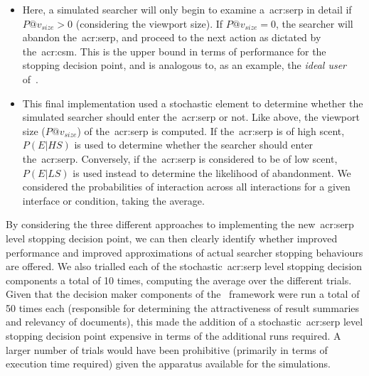 \begin{itemize}
    \item{ Here, a simulated searcher will only begin to examine a~\gls{acr:serp} in detail if $P@v_{size} > 0$ (considering the viewport size). If $P@v_{size} = 0$, the searcher will abandon the~\gls{acr:serp}, and proceed to the next action as dictated by the~\gls{acr:csm}. This is the upper bound in terms of performance for the stopping decision point, and is analogous to, as an example, the \emph{ideal user} of~\cite{hagen2016simulating_users}.}
    
    \item{ This final implementation used a stochastic element to determine whether the simulated searcher should enter the~\gls{acr:serp} or not. Like above, the viewport size ($P@v_{size}$) of the~\gls{acr:serp} is computed. If the~\gls{acr:serp} is of high scent, $P(E|HS)$ is used to determine whether the searcher should enter the~\gls{acr:serp}. Conversely, if the~\gls{acr:serp} is considered to be of low scent, $P(E|LS)$ is used instead to determine the likelihood of abandonment. We considered the probabilities of interaction across all interactions for a given interface or condition, taking the average.}
    
%
\end{itemize}

By considering the three different approaches to implementing the new~\gls{acr:serp} level stopping decision point, we can then clearly identify whether improved performance and improved approximations of actual searcher stopping behaviours are offered. We also trialled each of the stochastic~\gls{acr:serp} level stopping decision components a total of 10 times, computing the average over the different trials. Given that the decision maker components of the \simiir~framework were run a total of 50 times each (responsible for determining the attractiveness of result summaries and relevancy of documents), this made the addition of a stochastic~\gls{acr:serp} level stopping decision point expensive in terms of the additional runs required. A larger number of trials would have been prohibitive (primarily in terms of execution time required) given the apparatus available for the simulations.


